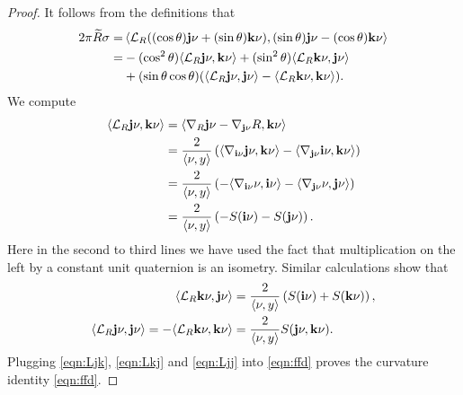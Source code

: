 \begin{proof}
It follows from the definitions that
\begin{equation}
\label{eqn:ffd}
\begin{split}
2\pi\widetilde{R}\sigma =& \left\langle {\mathcal L}_R((\cos\theta){\mathbf j}\nu + (\sin\theta){\mathbf k}\nu), (\sin\theta){\mathbf j}\nu - (\cos\theta){\mathbf k}\nu\right\rangle\\
=& -(\cos^2\theta)\langle {\mathcal L}_R{\mathbf j}\nu,{\mathbf k}\nu\rangle + (\sin^2\theta)\langle {\mathcal L}_R{\mathbf k}\nu,{\mathbf j}\nu\rangle\\
& +(\sin\theta\cos\theta)(\langle {\mathcal L}_R{\mathbf j}\nu,{\mathbf j}\nu\rangle - \langle {\mathcal L}_R{\mathbf k}\nu,{\mathbf k}\nu\rangle).
\end{split}
\end{equation}
We compute
\begin{align}
\nonumber
\langle {\mathcal L}_R{\mathbf j}\nu,{\mathbf k}\nu\rangle &= \langle \nabla_R{\mathbf j}\nu - \nabla_{{\mathbf j}\nu}R, {\mathbf k}\nu\rangle\\
\nonumber
&= \frac{2}{\langle \nu,y\rangle}\left(\langle \nabla_{{\mathbf i}\nu}{\mathbf j}\nu,{\mathbf k}\nu\rangle - \langle\nabla_{{\mathbf j}\nu}{\mathbf i}\nu, {\mathbf k}\nu\rangle\right)\\
\nonumber
&= \frac{2}{\langle \nu,y\rangle}\left(-\langle \nabla_{{\mathbf i}\nu}\nu,{\mathbf i}\nu\rangle -\langle \nabla_{{\mathbf j}\nu}\nu,{\mathbf j}\nu\rangle\right)\\
\label{eqn:Ljk}
&= \frac{2}{\langle \nu,y\rangle}\left(-S({\mathbf i}\nu) - S({\mathbf j}\nu)\right).
\end{align}
Here in the second to third lines we have used the fact that multiplication on the left by a constant unit quaternion is an isometry. Similar calculations show that
\begin{align}
\label{eqn:Lkj}
\langle {\mathcal L}_R{\mathbf k}\nu,{\mathbf j}\nu\rangle &= \frac{2}{\langle \nu,y\rangle}\left(S({\mathbf i}\nu) + S({\mathbf k}\nu)\right),\\
\label{eqn:Ljj}
\langle {\mathcal L}_R{\mathbf j}\nu,{\mathbf j}\nu\rangle = - \langle {\mathcal L}_R{\mathbf k}\nu,{\mathbf k}\nu\rangle &= \frac{2}{\langle\nu,y\rangle} S({\mathbf j}\nu,{\mathbf k}\nu).
\end{align}
Plugging \eqref{eqn:Ljk}, \eqref{eqn:Lkj} and \eqref{eqn:Ljj} into \eqref{eqn:ffd} proves the curvature identity \eqref{eqn:ffd}.
\end{proof}

